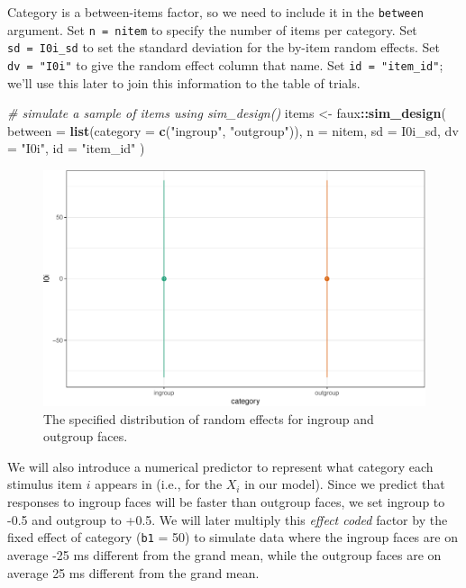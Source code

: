 \documentclass[man,floatsintext]{apa6}
\newenvironment{Shaded}{\begin{snugshade}}{\end{snugshade}}
\newcommand{\CommentTok}[1]{\textcolor[rgb]{0.56,0.35,0.01}{\textit{#1}}}
\newcommand{\DataTypeTok}[1]{\textcolor[rgb]{0.13,0.29,0.53}{#1}}
\newcommand{\KeywordTok}[1]{\textcolor[rgb]{0.13,0.29,0.53}{\textbf{#1}}}
\newcommand{\NormalTok}[1]{#1}
\newcommand{\OperatorTok}[1]{\textcolor[rgb]{0.81,0.36,0.00}{\textbf{#1}}}
\newcommand{\StringTok}[1]{\textcolor[rgb]{0.31,0.60,0.02}{#1}}
\begin{document}
Category is a between-items factor, so we need to include it in the \texttt{between} argument. Set \texttt{n\ =\ nitem} to specify the number of items per category. Set \texttt{sd\ =\ I0i\_sd} to set the standard deviation for the by-item random effects. Set \texttt{dv\ =\ "I0i"} to give the random effect column that name. Set \texttt{id\ =\ "item\_id"}; we'll use this later to join this information to the table of trials.

\begin{Shaded}
\begin{Highlighting}[]
\CommentTok{# simulate a sample of items using sim_design()}
\NormalTok{items <-}\StringTok{ }\NormalTok{faux}\OperatorTok{::}\KeywordTok{sim_design}\NormalTok{(}
  \DataTypeTok{between =} \KeywordTok{list}\NormalTok{(}\DataTypeTok{category =} \KeywordTok{c}\NormalTok{(}\StringTok{"ingroup"}\NormalTok{, }\StringTok{"outgroup"}\NormalTok{)),}
  \DataTypeTok{n =}\NormalTok{ nitem,}
  \DataTypeTok{sd =}\NormalTok{ I0i_sd,}
  \DataTypeTok{dv =} \StringTok{"I0i"}\NormalTok{,}
  \DataTypeTok{id =} \StringTok{"item_id"}
\NormalTok{)}
\end{Highlighting}
\end{Shaded}

\begin{figure}

{\centering \includegraphics[width=0.75\linewidth]{images/sim-items-1} 

}

\caption{The specified distribution of random effects for ingroup and outgroup faces.}\label{fig:sim-items}
\end{figure}

We will also introduce a numerical predictor to represent what category each stimulus item \(i\) appears in (i.e., for the \(X_i\) in our model). Since we predict that responses to ingroup faces will be faster than outgroup faces, we set ingroup to -0.5 and outgroup to +0.5. We will later multiply this \emph{effect coded} factor by the fixed effect of category (\texttt{b1} = 50) to simulate data where the ingroup faces are on average -25 ms different from the grand mean, while the outgroup faces are on average 25 ms different from the grand mean.
\end{document}
